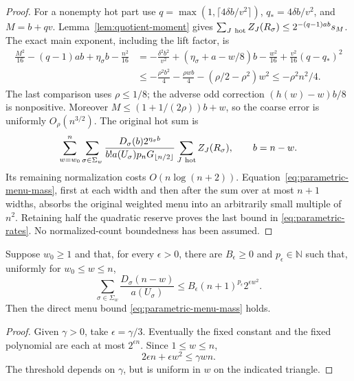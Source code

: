 \begin{proof}
For a nonempty hot part use
$q=\max(1,\lceil4\delta b/v^2\rceil)$, $q_*=4\delta b/v^2$,
and $M=b+qv$. Lemma~\ref{lem:quotient-moment} gives
$\sum_{J\ {\rm hot}}Z_J(R_\sigma)\leq2^{-(q-1)ab}s_M$.
The exact main exponent, including the lift factor, is
\begin{align*}
 \frac{M^2}{16}-(q-1)ab+\eta_\sigma b-\frac{n^2}{16}
 &=-\frac{\delta^2b^2}{v^2}
   +(\eta_\sigma+a-w/8)b-\frac{w^2}{16}
                      +\frac{v^2}{16}(q-q_*)^2\\
 &\leq-\frac{\rho^2b^2}{4}-\frac{\rho wb}{4}
                 -(\rho/2-\rho^2)w^2
 \leq-\rho^2n^2/4.
\end{align*}
The last comparison uses $\rho\leq1/8$; the adverse odd correction
$(h(w)-w)b/8$ is nonpositive. Moreover
$M\leq(1+1/(2\rho))b+w$, so the coarse error is uniformly
$O_\rho(n^{3/2})$. The original hot sum is
\[
 \sum_{w=w_0}^n\sum_{\sigma\in\Sigma_w}
 \frac{D_\sigma(b)2^{\eta_\sigma b}}
      {b!a(U_\sigma)p_nG_{\lfloor n/2\rfloor}}
       \sum_{J\ {\rm hot}}Z_J(R_\sigma),\qquad b=n-w.
\]
Its remaining normalization costs $O(n\log(n+2))$.
Equation~\eqref{eq:parametric-menu-mass}, first at each width and then
after the sum over at most $n+1$ widths, absorbs the original weighted
menu into an arbitrarily small multiple of $n^2$. Retaining half the
quadratic reserve proves the last bound in
\eqref{eq:parametric-rates}. No normalized-count boundedness has been
assumed.
\end{proof}

\begin{lemma}
\label{lem:concrete-menu-mass}
Suppose $w_0\geq1$ and that, for every $\epsilon>0$, there are
$B_\epsilon\geq0$ and $p_\epsilon\in\mathbb N$ such that, uniformly for
$w_0\leq w\leq n$,
\[
 \sum_{\sigma\in\Sigma_w}
       \frac{D_\sigma(n-w)}{a(U_\sigma)}
 \leq B_\epsilon(n+1)^{p_\epsilon}2^{\epsilon w^2}.
\]
Then the direct menu bound \eqref{eq:parametric-menu-mass} holds.
\end{lemma}
\begin{proof}
Given $\gamma>0$, take $\epsilon=\gamma/3$.  Eventually the fixed constant
and the fixed polynomial are each at most $2^{\epsilon n}$.  Since
$1\leq w\leq n$,
\[
 2\epsilon n+\epsilon w^2\leq\gamma wn.
\]
The threshold depends on $\gamma$, but is uniform in $w$ on the indicated
triangle.
\end{proof}

